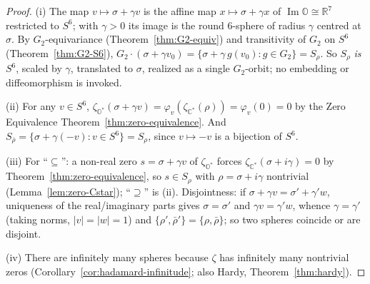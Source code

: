 \documentclass[11pt]{article}
\newcommand{\OO}{\mathbb{O}}
\newcommand{\CC}{\mathbb{C}}
\newcommand{\RR}{\mathbb{R}}
\newcommand{\Ostar}{\OO^{*}}
\newcommand{\Cstar}{\CC^{*}}
\newcommand{\zetaO}{\zeta_{\Ostar}}
\newcommand{\zetaC}{\zeta_{\Cstar}}
\DeclareMathOperator{\im}{Im}
\providecommand{\Gtwo}{G_2}
\theoremstyle{plain}
\theoremstyle{definition}
\theoremstyle{remark}
\begin{document}
\begin{proof}
(i) The map $v\mapsto\sigma+\gamma v$ is the affine map $x\mapsto\sigma+\gamma x$ of
$\im\OO\cong\RR^7$ restricted to $S^6$; with $\gamma>0$ its image is the round $6$-sphere
of radius $\gamma$ centred at $\sigma$. By $\Gtwo$-equivariance
(Theorem~\ref{thm:G2-equiv}) and transitivity of $\Gtwo$ on $S^6$
(Theorem~\ref{thm:G2-S6}), $\Gtwo\cdot(\sigma+\gamma v_0)=\{\sigma+\gamma\,g(v_0):g\in\Gtwo\}=S_\rho$.
So $S_\rho$ \emph{is} $S^6$, scaled by $\gamma$, translated to $\sigma$, realized as
a single $\Gtwo$-orbit; no embedding or diffeomorphism is invoked.

(ii) For any $v\in S^6$, $\zetaO(\sigma+\gamma v)=\varphi_v(\zetaC(\rho))=\varphi_v(0)=0$
by the Zero Equivalence Theorem~\ref{thm:zero-equivalence}. And
$S_{\bar\rho}=\{\sigma+\gamma(-v):v\in S^6\}=S_\rho$, since $v\mapsto-v$ is a bijection of
$S^6$.

(iii) For ``$\subseteq$'': a non-real zero $s=\sigma+\gamma v$ of $\zetaO$ forces
$\zetaC(\sigma+i\gamma)=0$ by Theorem~\ref{thm:zero-equivalence}, so $s\in S_\rho$ with
$\rho=\sigma+i\gamma$ nontrivial (Lemma~\ref{lem:zero-Cstar}); ``$\supseteq$'' is (ii).
Disjointness: if $\sigma+\gamma v=\sigma'+\gamma'w$, uniqueness of the real/imaginary
parts gives $\sigma=\sigma'$ and $\gamma v=\gamma'w$, whence $\gamma=\gamma'$ (taking
norms, $|v|=|w|=1$) and $\{\rho',\bar\rho'\}=\{\rho,\bar\rho\}$; so two spheres coincide or
are disjoint.

(iv) There are infinitely many spheres because $\zeta$ has infinitely many nontrivial zeros
(Corollary~\ref{cor:hadamard-infinitude}; also Hardy, Theorem~\ref{thm:hardy}).
\end{proof}

\end{document}

